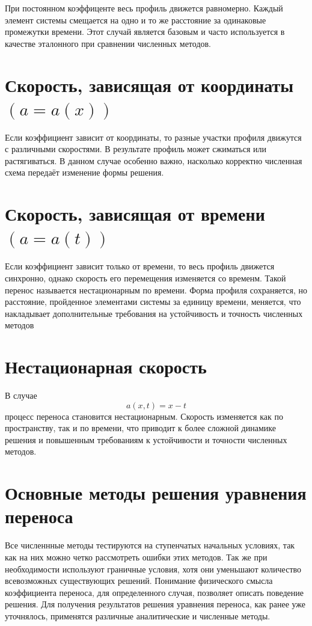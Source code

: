 \documentclass[a4paper,14pt]{extreport}
\begin{document}
При постоянном коэффиценте весь профиль движется равномерно. Каждый элемент
системы смещается на одно и то же расстояние за одинаковые промежутки
времени. Этот случай является базовым и часто используется в качестве
эталонного при сравнении численных методов.

\section*{Скорость, зависящая от координаты $(a = a(x))$}

Если коэффициент зависит от координаты, то разные участки профиля движутся с различными
скоростями. В результате профиль может сжиматься или растягиваться.
В данном случае особенно важно, насколько корректно численная схема
передаёт изменение формы решения.

\section*{Скорость, зависящая от времени $(a = a(t))$}

Если коэффициент зависит только от времени, то весь профиль движется синхронно, однако скорость его перемещения изменяется со временм. Такой перенос называется нестационарным по времени. Форма профиля сохраняется, но расстояние, пройденное элементами системы за единицу времени, меняется, что накладывает дополнительные требования на устойчивость и точность численных методов

\section*{Нестационарная скорость}

В случае
\begin{equation}
a(x,t) = x - t
\end{equation}
процесс переноса становится нестационарным. Скорость изменяется как по
пространству, так и по времени, что приводит к более сложной динамике
решения и повышенным требованиям к устойчивости и точности численных
методов.

\section*{Основные методы решения уравнения переноса}

Все численнные методы тестируются на ступенчатых начальных условиях, так как на них можно четко рассмотреть ошибки этих методов. Так же при необходимости используют граничные условия, хотя они уменьшают количество всевозможных существующих решений. Понимание физического смысла коэффициента переноса, для определенного случая, позволяет описать поведение решения. Для получения результатов решения уравнения переноса, как ранее уже уточнялось, применятся различные аналитические и численные методы.
\end{document}
